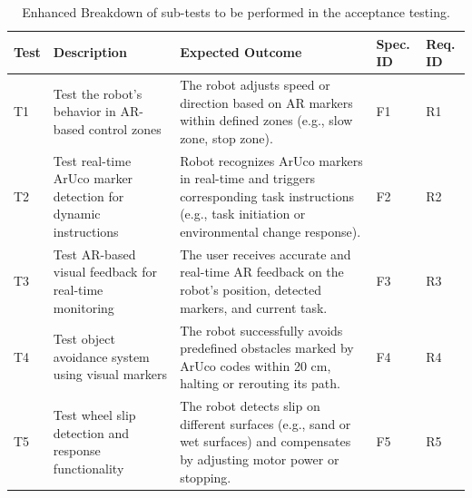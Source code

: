 \begin{table}[ht]
	\centering
	\caption{Enhanced Breakdown of sub-tests to be performed in the acceptance testing.}
	\label{tab:testing}
	\begin{tabular}{|p{0.8cm}|p{3.6cm}|p{7.5cm}|p{0.9cm}|p{0.9cm}|}
		\hline
		\textbf{Test} & \textbf{Description}                                           & \textbf{Expected Outcome}                                                                                                                          & \textbf{Spec. ID} & \textbf{Req. ID} \\ \hline
		T1            & Test the robot’s behavior in AR-based control zones            & The robot adjusts speed or direction based on AR markers within defined zones (e.g., slow zone, stop zone).                                        & F1                & R1               \\ \hline
		T2            & Test real-time ArUco marker detection for dynamic instructions & Robot recognizes ArUco markers in real-time and triggers corresponding task instructions (e.g., task initiation or environmental change response). & F2                & R2               \\ \hline
		T3            & Test AR-based visual feedback for real-time monitoring         & The user receives accurate and real-time AR feedback on the robot’s position, detected markers, and current task.                                  & F3                & R3               \\ \hline
		T4            & Test object avoidance system using visual markers              & The robot successfully avoids predefined obstacles marked by ArUco codes within 20 cm, halting or rerouting its path.                              & F4                & R4               \\ \hline
		T5            & Test wheel slip detection and response functionality           & The robot detects slip on different surfaces (e.g., sand or wet surfaces) and compensates by adjusting motor power or stopping.                    & F5                & R5               \\ \hline
	\end{tabular}
\end{table}

